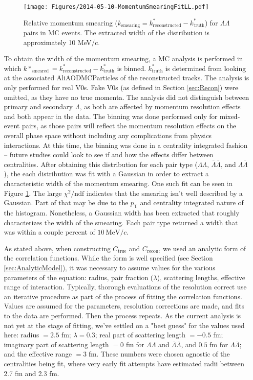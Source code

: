 \begin{figure}
\texttt{[image: Figures/2014-05-10-MomentumSmearingFitLL.pdf]}
\caption[Relative momentum smearing]{Relative momentum smearing ($k_{\mathrm{smearing}} = k^*_{\mathrm{reconstructed}} - k^*_{\mathrm{truth}}$) for $\Lambda\Lambda$ pairs in MC events.  The extracted width of the distribution is approximately 10 MeV/c.}
\label{fig:MomSmearingFit}
\end{figure}

To obtain the width of the momentum smearing, a MC analysis is performed in which $k*_{\mathrm{smeared}} = k^*_{\mathrm{reconstructed}} - k^*_{\mathrm{truth}}$ is binned.  $k^*_{\mathrm{truth}}$ is determined from looking at the associated AliAODMCParticles of the reconstructed tracks.  The analysis is only performed for real V0s.  Fake V0s (as defined in Section \ref{sec:Recon}) were omitted, as they have no true momenta.  The analysis did not distinguish between primary and secondary $\Lambda$, as both are affected by momentum resolution effects and both appear in the data.  The binning was done performed only for mixed-event pairs, as those pairs will reflect the momentum resolution effects on the overall phase space without including any complications from physics interactions.  At this time, the binning was done in a centrality integrated fashion -- future studies could look to see if and how the effects differ between centralities.  After obtaining this distribution for each pair type ($\Lambda\Lambda$, $\bar{\Lambda}\bar{\Lambda}$, and $\Lambda\bar{\Lambda}$), the each distribution was fit with a Gaussian in order to extract a characteristic width of the momentum smearing.  One such fit can be seen in Figure \ref{fig:MomSmearingFit}.  The large $\chi^2 /\mathrm{ndf}$ indicates that the smearing isn't well described by a Gaussian.  Part of that may be due to the $p_\mathrm{T}$ and centrality integrated nature of the histogram.  Nonetheless, a Gaussian width has been extracted that roughly characterizes the width of the smearing.  Each pair type returned a width that was within a couple percent of $10\ \mathrm{MeV}/c$.

As stated above, when constructing $C_\mathrm{true}$ and $C_\mathrm{recon}$, we used an analytic form of the correlation functions.  While the form is well specified (see Section \ref{sec:AnalyticModel}), it was necessary to assume values for the various parameters of the equation: radius, pair fraction ($\lambda$), scattering lengths, effective range of interaction.  Typically, thorough evaluations of the resolution correct use an iterative procedure as part of the process of fitting the correlation functions.  Values are assumed for the parameters, resolution corrections are made, and fits to the data are performed.  Then the process repeats.  As the current analysis is not yet at the stage of fitting, we've settled on a "best guess" for the values used here: radius $=2.5$ fm; $\lambda = 0.3$; real part of scattering length $= -0.5$ fm; imaginary part of scattering length $= 0$ fm for $\Lambda\Lambda$ and $\bar{\Lambda}\bar{\Lambda}$, and $0.5$ fm for $\Lambda\bar{\Lambda}$; and the effective range $=3$ fm.  These numbers were chosen agnostic of the centralities being fit, where very early fit attempts have estimated radii between 2.7 fm and 2.3 fm.  


